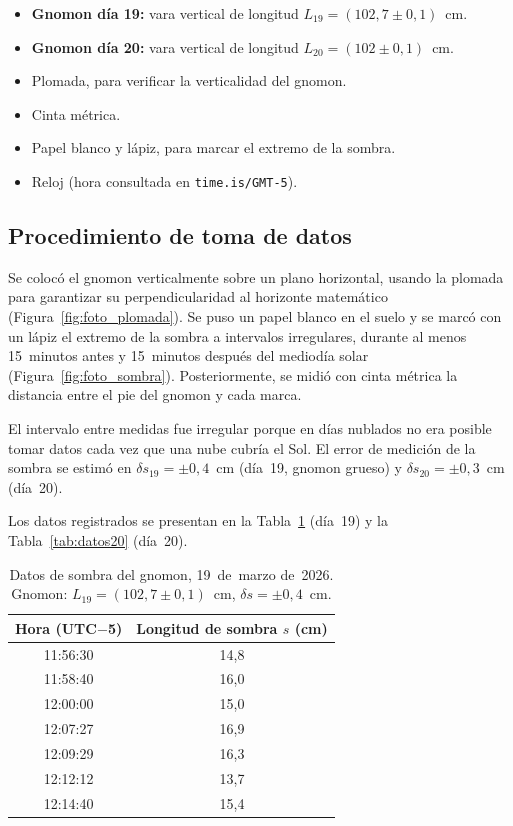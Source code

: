 \documentclass[12pt,a4paper]{article}
\begin{document}
\begin{itemize}
  \item \textbf{Gnomon día 19:} vara vertical de longitud
        $L_{19} = (102{,}7 \pm 0{,}1)$~cm.
  \item \textbf{Gnomon día 20:} vara vertical de longitud
        $L_{20} = (102 \pm 0{,}1)$~cm.
  \item Plomada, para verificar la verticalidad del gnomon.
  \item Cinta métrica.
  \item Papel blanco y lápiz, para marcar el extremo de la sombra.
  \item Reloj (hora consultada en \texttt{time.is/GMT-5}).
\end{itemize}

\subsection{Procedimiento de toma de datos}

Se colocó el gnomon verticalmente sobre un plano horizontal,
usando la plomada para garantizar su perpendicularidad al horizonte
matemático (Figura~\ref{fig:foto_plomada}).
Se puso un papel blanco en el suelo y se marcó con un lápiz el extremo
de la sombra a intervalos irregulares, durante al menos 15~minutos antes
y 15~minutos después del mediodía solar
(Figura~\ref{fig:foto_sombra}).
Posteriormente, se midió con cinta métrica la distancia entre el pie
del gnomon y cada marca.

El intervalo entre medidas fue irregular porque en días nublados no era
posible tomar datos cada vez que una nube cubría el Sol.
El error de medición de la sombra se estimó en $\delta s_{19} = \pm 0{,}4$~cm
(día~19, gnomon grueso) y $\delta s_{20} = \pm 0{,}3$~cm (día~20).

Los datos registrados se presentan en la Tabla~\ref{tab:datos19}
(día~19) y la Tabla~\ref{tab:datos20} (día~20).

\begin{table}[H]
  \centering
  \caption{Datos de sombra del gnomon, 19~de~marzo de~2026.
           Gnomon: $L_{19} = (102{,}7 \pm 0{,}1)$~cm,
           $\delta s = \pm 0{,}4$~cm.}
  \label{tab:datos19}
  \begin{tabular}{cc}
    \toprule
    Hora (UTC$-$5) & Longitud de sombra $s$ (cm) \\
    \midrule
    11:56:30 & 14{,}8 \\
    11:58:40 & 16{,}0 \\
    12:00:00 & 15{,}0 \\
    12:07:27 & 16{,}9 \\
    12:09:29 & 16{,}3 \\
    12:12:12 & 13{,}7 \\
    12:14:40 & 15{,}4 \\
    \bottomrule
  \end{tabular}
\end{table}
\end{document}
